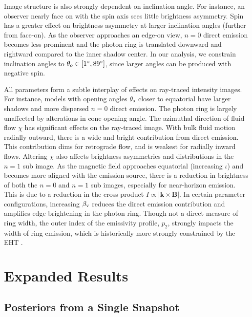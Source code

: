 \documentclass[linenumbers, twocolumn, tighten]{aastex701}
\begin{document}
Image structure is also strongly dependent on inclination angle. For instance, an observer nearly face on with the spin axis sees little brightness asymmetry. Spin has a greater effect on brightness asymmetry at larger inclination angles (further from face-on). As the observer approaches an edge-on view, $n = 0$ direct emission becomes less prominent and the photon ring is translated downward and rightward compared to the inner shadow center. In our analysis, we constrain inclination angles to $\theta_o \in [1\degree, 89\degree]$, since larger angles can be produced with negative spin. 

All parameters form a subtle interplay of effects on ray-traced intensity images. For instance, models with opening angles $\theta_{\rm s}$ closer to equatorial have larger shadows and more dispersed $n=0$ direct emission. The photon ring is largely unaffected by alterations in cone opening angle.  The azimuthal direction of fluid flow $\chi$ has significant effects on the ray-traced image. With bulk fluid motion radially outward, there is a wide and bright contribution from direct emission. This contribution dims for retrograde flow, and is weakest for radially inward flows. Altering $\chi$ also affects brightness asymmetries and distributions in the $n=1$ sub image. As the magnetic field approaches equatorial (increasing $\iota$) and becomes more aligned with the emission source, there is a reduction in brightness of both the $n=0$ and $n=1$ sub images, especially for near-horizon emission. This is due to a reduction in the cross product $I \propto |\mathbf{k} \times \mathbf{B}|$. In certain parameter configurations, increasing $\beta_{\rm v}$ reduces the direct emission contribution and amplifies edge-brightening in the photon ring. Though not a direct measure of ring width, the outer index of the emissivity profile, $p_2$, strongly impacts the width of ring emission, which is historically more strongly constrained by the EHT .


\section{Expanded Results}\label{sec:results-appendix}
\subsection{Posteriors from a Single Snapshot}\label{subsec:results-appendix-snapshot}
\end{document}
